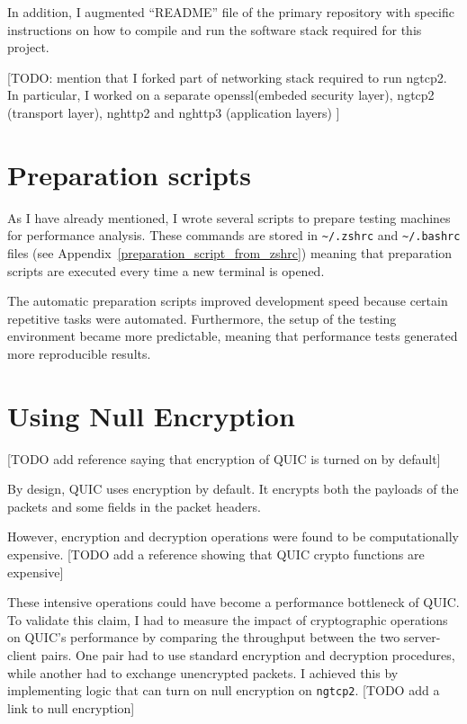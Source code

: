 \documentclass[12pt,a4paper,twoside,openright]{report}
\begin{document}
In addition, I augmented \enquote{README} file of the primary repository with specific instructions on how to compile and run the software stack required for this project.

[TODO: mention that I forked part of networking stack required to run ngtcp2. In particular, I worked on a separate openssl(embeded security layer), ngtcp2 (transport layer), nghttp2 and nghttp3 (application layers) ]

\section{Preparation scripts}
As I have already mentioned, I wrote several scripts to prepare testing machines for performance analysis.
These commands are stored in \texttt{\textasciitilde/.zshrc} and \texttt{\textasciitilde/.bashrc} files (see Appendix~\ref{preparation_script_from_zshrc}) meaning that preparation scripts are executed every time a new terminal is opened.



The automatic preparation scripts improved development speed because certain repetitive tasks were automated.
Furthermore, the setup of the testing environment became more predictable, meaning that performance tests generated more reproducible results.



\section{Using Null Encryption}
[TODO add reference saying that encryption of QUIC is turned on by default]

By design, QUIC uses encryption by default.
It encrypts both the payloads of the packets and some fields in the packet headers.


However, encryption and decryption operations were found to be computationally expensive.
[TODO add a reference showing that QUIC crypto functions are expensive]

These intensive operations could have become a performance bottleneck of QUIC.
To validate this claim, I had to measure the impact of cryptographic operations on QUIC's performance by comparing the throughput between the two server-client pairs.
One pair had to use standard encryption and decryption procedures, while another had to exchange unencrypted packets.
I achieved this by implementing logic that can turn on null encryption on \texttt{ngtcp2}.
[TODO add a link to null encryption]
\end{document}
